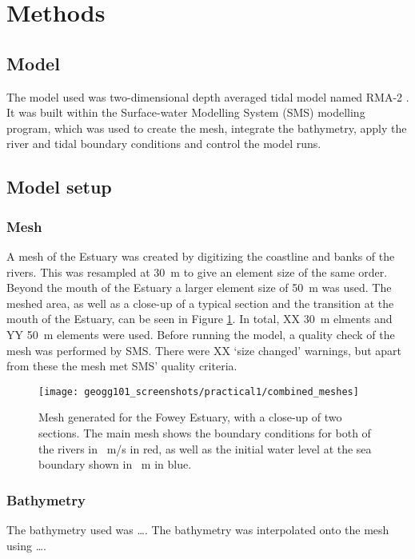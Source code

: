 \documentclass{article}
\begin{document}
\section{Methods}

\subsection{Model}

The model used was two-dimensional depth averaged tidal model named RMA-2 \parencite{king1990program}. It was built within the Surface-water Modelling System (SMS) modelling program, which was used to create the mesh, integrate the bathymetry, apply the river and tidal boundary conditions and control the model runs.

\subsection{Model setup}

\subsubsection{Mesh}
A mesh of the Estuary was created by digitizing the coastline and banks of the rivers. This was resampled at \SI{30}{m} to give an element size of the same order. Beyond the mouth of the Estuary a larger element size of \SI{50}{m} was used. The meshed area, as well as a close-up of a typical section and the transition at the mouth of the Estuary, can be seen in Figure \ref{fig:combined_meshes}. In total, XX \SI{30}{m} elments and YY \SI{50}{m} elements were used. Before running the model, a quality check of the mesh was performed by SMS. There were XX `size changed' warnings, but apart from these the mesh met SMS' quality criteria.


\begin{figure}[hbp]
    \centering
    \texttt{[image: geogg101\_screenshots/practical1/combined\_meshes]}
    \caption{Mesh generated for the Fowey Estuary, with a close-up of two sections. The main mesh shows the boundary conditions for both of the rivers in \SI{}{m/s} in red, as well as the initial water level at the sea boundary shown in \SI{}{m} in blue.}
    \label{fig:combined_meshes}
\end{figure}

\subsubsection{Bathymetry}
The bathymetry used was \ldots. The bathymetry was interpolated onto the mesh using \dots.
\end{document}
